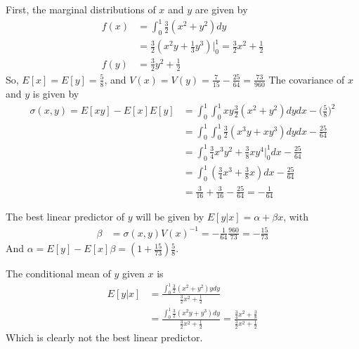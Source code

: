 \documentclass{article}[14pt]
\begin{document}
    First, the marginal distributions of $x$ and $y$ are given by
    \begin{align*}
        f(x) &= \int_0^1 \frac{3}{2} (x^2 + y^2) dy \\
        &= \frac{3}{2} (x^2y + \frac{1}{3}y^3) \bigg|^1_0 = \frac{3}{2} x^2 + \frac{1}{2} \\
        f(y) &= \frac{3}{2}y^2 + \frac{1}{2}
    \end{align*}
    So, $E[x] = E[y] = \frac{5}{8}$, and $V(x) = V(y) = \frac{7}{15} - \frac{25}{64} = \frac{73}{960}$ The covariance of $x$ and $y$ is given by
    \begin{align*}
        \sigma(x,y) = E[xy] - E[x]E[y] &= \int_0^1 \int_0^1 xy \frac{3}{2} (x^2 + y^2) dydx - \Big(\frac{5}{8}\Big)^2 \\
        &= \int_0^1 \int_0^1 \frac{3}{2} (x^3y + xy^3) dydx - \frac{25}{64} \\
        &= \int_0^1 \frac{3}{4} x^3y^2 + \frac{3}{8}xy^4 \bigg|_0^1 dx - \frac{25}{64} \\
        &= \int_0^1 (\frac{3}{4} x^3 + \frac{3}{8}x) dx - \frac{25}{64} \\
        &= \frac{3}{16} + \frac{3}{16} - \frac{25}{64} = - \frac{1}{64}
    \end{align*}

    The best linear predictor of $y$ will be given by $E[y|x] = \alpha + \beta x$, with
    \begin{align*}
        \beta &= \sigma(x,y)V(x)^{-1} = -\frac{1}{64}\frac{960}{73} = -\frac{15}{73}
    \end{align*}
    And $\alpha = E[y] - E[x] \beta = (1 + \frac{15}{73})\frac{5}{8}$.

    The conditional mean of $y$ given $x$ is
    \begin{align*}
        E[y|x] &= \frac{\int_0^1 \frac{3}{2}(x^2 + y^2)y dy }{\frac{3}{2} x^2 + \frac{1}{2}} \\
        &= \frac{\int_0^1 \frac{3}{2}(x^2y + y^3) dy }{\frac{3}{2} x^2 + \frac{1}{2}} = \frac{ \frac{3}{4}x^2 + \frac{3}{8} }{\frac{3}{2} x^2 + \frac{1}{2}}
    \end{align*}
    Which is clearly not the best linear predictor.
\end{document}
